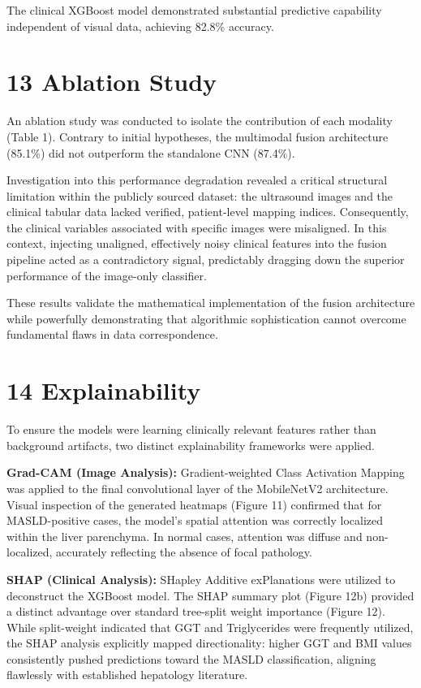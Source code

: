 The clinical XGBoost model demonstrated substantial predictive
capability independent of visual data, achieving 82.8\% accuracy.

\section{13 Ablation Study}\label{ablation-study}

An ablation study was conducted to isolate the contribution of each
modality (Table 1). Contrary to initial hypotheses, the multimodal
fusion architecture (85.1\%) did not outperform the standalone CNN
(87.4\%).

Investigation into this performance degradation revealed a critical
structural limitation within the publicly sourced dataset: the
ultrasound images and the clinical tabular data lacked verified,
patient-level mapping indices. Consequently, the clinical variables
associated with specific images were misaligned. In this context,
injecting unaligned, effectively noisy clinical features into the fusion
pipeline acted as a contradictory signal, predictably dragging down the
superior performance of the image-only classifier.

These results validate the mathematical implementation of the fusion
architecture while powerfully demonstrating that algorithmic
sophistication cannot overcome fundamental flaws in data correspondence.

\section{14 Explainability}\label{explainability}

To ensure the models were learning clinically relevant features rather
than background artifacts, two distinct explainability frameworks were
applied.

\textbf{Grad-CAM (Image Analysis):} Gradient-weighted Class Activation
Mapping was applied to the final convolutional layer of the MobileNetV2
architecture. Visual inspection of the generated heatmaps (Figure 11)
confirmed that for MASLD-positive cases, the model's spatial attention
was correctly localized within the liver parenchyma. In normal cases,
attention was diffuse and non-localized, accurately reflecting the
absence of focal pathology.

\textbf{SHAP (Clinical Analysis):} SHapley Additive exPlanations were
utilized to deconstruct the XGBoost model. The SHAP summary plot (Figure
12b) provided a distinct advantage over standard tree-split weight
importance (Figure 12). While split-weight indicated that GGT and
Triglycerides were frequently utilized, the SHAP analysis explicitly
mapped directionality: higher GGT and BMI values consistently pushed
predictions toward the MASLD classification, aligning flawlessly with
established hepatology literature.

